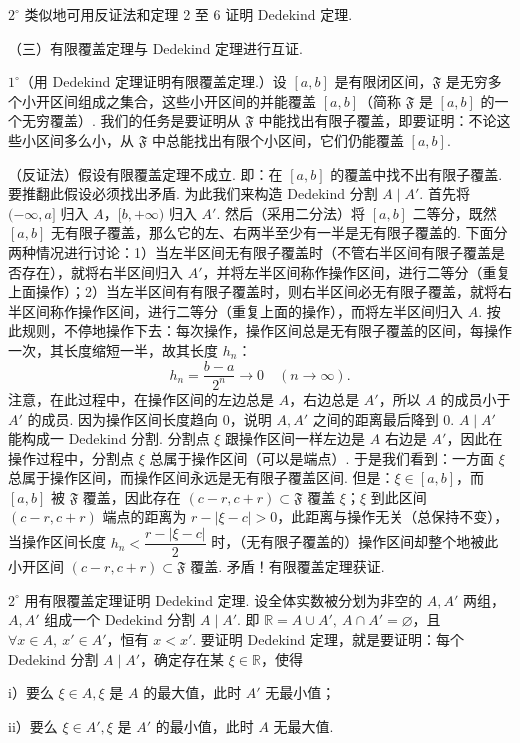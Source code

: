 \documentclass[UTF8, 12pt, fontset=fandol, oneside]{ctexart}
\begin{document}
$2^\circ$ 类似地可用反证法和定理 2 至 6 证明 Dedekind 定理.

（三）有限覆盖定理与 Dedekind 定理进行互证.

$1^\circ$（用 Dedekind 定理证明有限覆盖定理.）设 $[a,b]$ 是有限闭区间，$\mathfrak{F}$ 是无穷多个小开区间组成之集合，这些小开区间的并能覆盖 $[a,b]$（简称 $\mathfrak{F}$ 是 $[a,b]$ 的一个无穷覆盖）. 我们的任务是要证明从 $\mathfrak{F}$ 中能找出有限子覆盖，即要证明：不论这些小区间多么小，从 $\mathfrak{F}$ 中总能找出有限个小区间，它们仍能覆盖 $[a,b]$.

（反证法）假设有限覆盖定理不成立. 即：在 $[a,b]$ 的覆盖中找不出有限子覆盖. 要推翻此假设必须找出矛盾. 为此我们来构造 Dedekind 分割 $A\mid A'$. 首先将 $(-\infty,a]$ 归入 $A$，$[b,+\infty)$ 归入 $A'$. 然后（采用二分法）将 $[a,b]$ 二等分，既然 $[a,b]$ 无有限子覆盖，那么它的左、右两半至少有一半是无有限子覆盖的. 下面分两种情况进行讨论：1）当左半区间无有限子覆盖时（不管右半区间有限子覆盖是否存在），就将右半区间归入 $A'$，并将左半区间称作操作区间，进行二等分（重复上面操作）；2）当左半区间有有限子覆盖时，则右半区间必无有限子覆盖，就将右半区间称作操作区间，进行二等分（重复上面的操作），而将左半区间归入 $A$. 按此规则，不停地操作下去：每次操作，操作区间总是无有限子覆盖的区间，每操作一次，其长度缩短一半，故其长度 $h_n$：
\[
  h_n=\frac{b-a}{2^n}\to0\quad(n\to\infty).
\]
注意，在此过程中，在操作区间的左边总是 $A$，右边总是 $A'$，所以 $A$ 的成员小于 $A'$ 的成员. 因为操作区间长度趋向 0，说明 $A,A'$ 之间的距离最后降到 0. $A\mid A'$ 能构成一 Dedekind 分割. 分割点 $\xi$ 跟操作区间一样左边是 $A$ 右边是 $A'$，因此在操作过程中，分割点 $\xi$ 总属于操作区间（可以是端点）. 于是我们看到：一方面 $\xi$ 总属于操作区间，而操作区间永远是无有限子覆盖区间. 但是：$\xi\in[a,b]$，而 $[a,b]$ 被 $\mathfrak{F}$ 覆盖，因此存在 $(c-r,c+r)\subset\mathfrak{F}$ 覆盖 $\xi$；$\xi$ 到此区间 $(c-r,c+r)$ 端点的距离为 $r-|\xi-c|>0$，此距离与操作无关（总保持不变），当操作区间长度 $h_n<\dfrac{r-|\xi-c|}{2}$ 时，（无有限子覆盖的）操作区间却整个地被此小开区间 $(c-r,c+r)\subset\mathfrak{F}$ 覆盖. 矛盾！有限覆盖定理获证.

$2^\circ$ 用有限覆盖定理证明 Dedekind 定理. 设全体实数被分划为非空的 $A,A'$ 两组，$A,A'$ 组成一个 Dedekind 分割 $A\mid A'$. 即 $\mathbb{R}=A\cup A',\ A\cap A'=\varnothing$，且 $\forall x\in A,\ x'\in A'$，恒有 $x<x'$. 要证明 Dedekind 定理，就是要证明：每个 Dedekind 分割 $A\mid A'$，确定存在某 $\xi\in\mathbb{R}$，使得

i）要么 $\xi\in A,\xi$ 是 $A$ 的最大值，此时 $A'$ 无最小值；

ii）要么 $\xi\in A',\xi$ 是 $A'$ 的最小值，此时 $A$ 无最大值.
\end{document}
